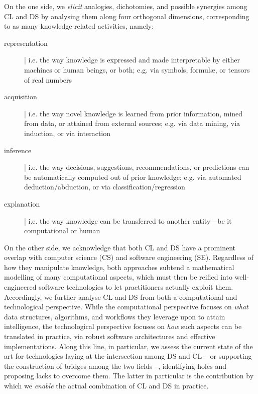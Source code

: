 \documentclass[12pt,a4paper,openright,twoside]{book}
\begin{document}
On the one side, we \emph{elicit} analogies, dichotomies, and possible synergies among CL and DS by analysing them along four orthogonal dimensions, corresponding to as many knowledge-related activities, namely:
%
\begin{description}
    \item[representation] | i.e. the way knowledge is expressed and made interpretable by either machines or human beings, or both; e.g. via symbols, formul\ae, or tensors of real numbers

    \item[acquisition] | i.e. the way novel knowledge is learned from prior information, mined from data, or attained from external sources; e.g. via data mining, via induction, or via interaction

    \item[inference] |  i.e. the way decisions, suggestions, recommendations, or predictions can be automatically computed out of prior knowledge; e.g. via automated deduction/abduction, or via classification/regression

    \item[explanation] | i.e. the way knowledge can be transferred to another entity---be it computational or human
\end{description}

On the other side, we acknowledge that both CL and DS have a prominent overlap with computer science (CS) and software engineering (SE).
%
Regardless of how they manipulate knowledge, both approaches subtend a mathematical modelling of many computational aspects, which must then be reified into well-engineered software technologies to let practitioners actually exploit them.
%
Accordingly, we further analyse CL and DS from both a computational and technological perspective.
%
While the computational perspective focuses on \emph{what} data structures, algorithms, and workflows they leverage upon to attain intelligence, the technological perspective focuses on \emph{how} such aspects can be translated in practice, via robust software architectures and effective implementations.
%
Along this line, in particular, we assess the current state of the art for technologies laying at the intersection among DS and CL -- or supporting the construction of bridges among the two fields --, identifying holes and proposing lacks to overcome them.
%
The latter in particular is the contribution by which we \emph{enable} the actual combination of CL and DS in practice.
\end{document}
